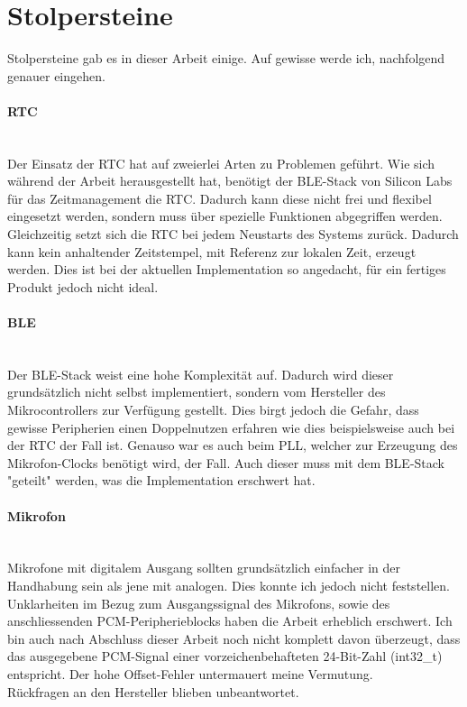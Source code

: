 \documentclass[12pt]{article}
\begin{document}
	\newpage
	\section{Stolpersteine}
	Stolpersteine gab es in dieser Arbeit einige. Auf gewisse werde ich, nachfolgend genauer eingehen.
	\paragraph{RTC}\mbox{}\\
	Der Einsatz der RTC hat auf zweierlei Arten zu Problemen geführt. Wie sich während der Arbeit herausgestellt hat, benötigt der BLE-Stack von Silicon Labs für das Zeitmanagement die RTC. Dadurch kann diese nicht frei und flexibel eingesetzt werden, sondern muss über spezielle Funktionen abgegriffen werden. Gleichzeitig setzt sich die RTC bei jedem Neustarts des Systems zurück. Dadurch kann kein anhaltender Zeitstempel, mit Referenz zur lokalen Zeit, erzeugt werden. Dies ist bei der aktuellen Implementation so angedacht, für ein fertiges Produkt jedoch nicht ideal.
	\paragraph{BLE}\mbox{}\\
	Der BLE-Stack weist eine hohe Komplexität auf. Dadurch wird dieser grund\-sätzlich nicht selbst implementiert, sondern vom Hersteller des Mikrocontrollers zur Verfügung gestellt. Dies birgt jedoch die Gefahr, dass gewisse Peripherien einen Doppelnutzen erfahren wie dies beispielsweise auch bei der RTC der Fall ist. Genauso war es auch beim PLL, welcher zur Erzeugung des Mikrofon-Clocks benötigt wird, der Fall. Auch dieser muss mit dem BLE-Stack "geteilt" werden, was die Implementation erschwert hat. 
	\paragraph{Mikrofon}\mbox{}\\
	Mikrofone mit digitalem Ausgang sollten grundsätzlich einfacher in der Handhabung sein als jene mit analogen. Dies konnte ich jedoch nicht feststellen. Unklarheiten im Bezug zum Ausgangssignal des Mikrofons, sowie des anschliessenden PCM-Peripherieblocks haben die Arbeit erheblich erschwert. Ich bin auch nach Abschluss dieser Arbeit noch nicht komplett davon überzeugt, dass das ausgegebene PCM-Signal einer vorzeichenbehafteten 24-Bit-Zahl (int32\_t) entspricht. Der hohe Offset-Fehler untermauert meine Vermutung. \\ Rückfragen an den Hersteller blieben unbeantwortet.
	
\end{document}
